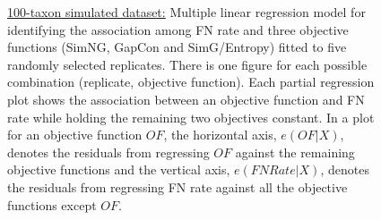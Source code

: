 \begin{figure}[!htbp]
\begin{adjustwidth}{-1cm}{-1cm}
\begin{tabular}{l||C{0.24\textwidth}|C{0.24\textwidth}|C{0.24\textwidth}|C{0.24\textwidth} }
			 & 
			 & 
			\\\hline
		\end{tabular}	
		\caption{\underline{100-taxon simulated dataset:} Multiple linear regression model for identifying the association among FN rate and three objective functions (SimNG, GapCon and SimG/Entropy) fitted to five randomly selected replicates. There is one figure for each possible combination (replicate, objective function). Each partial regression plot shows the association between an objective function and FN rate while holding the remaining two objectives constant.  In a plot for an objective function $ OF $, the horizontal axis, $e(OF|X)$, denotes the residuals from regressing $OF$ against the remaining objective functions and the vertical axis, $e(FNRate|X)$, denotes the residuals from regressing FN rate against all the objective functions except $ OF $.}
		\label{fig:new_mul_lin_reg}
	\end{adjustwidth}
\end{figure}
